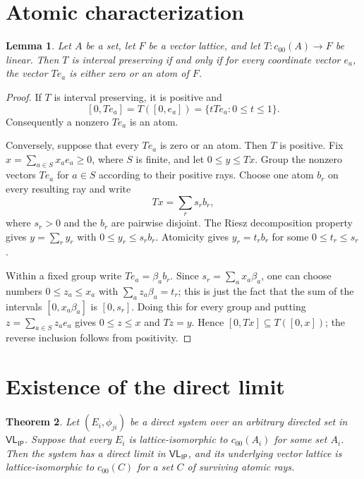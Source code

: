 \documentclass[11pt,a4paper]{article}
\newtheorem{theorem}{Theorem}
\newtheorem{lemma}[theorem]{Lemma}
\newcommand{\VLIP}{\mathsf{VL}_{\mathsf{IP}}}
\begin{document}
\section{Atomic characterization}

\begin{lemma}\label{lem:monomial}
Let $A$ be a set, let $F$ be a vector lattice, and let
$T:c_{00}(A)\to F$ be linear.  Then $T$ is interval preserving if and only if
for every coordinate vector $e_a$, the vector $Te_a$ is either zero or an
atom of $F$.
\end{lemma}

\begin{proof}
If $T$ is interval preserving, it is positive and
\[
 [0,Te_a]=T([0,e_a])=\{tTe_a:0\leq t\leq1\}.
\]
Consequently a nonzero $Te_a$ is an atom.

Conversely, suppose that every $Te_a$ is zero or an atom.  Then $T$ is
positive.  Fix $x=\sum_{a\in S}x_ae_a\geq0$, where $S$ is finite, and let
$0\leq y\leq Tx$.  Group the nonzero vectors $Te_a$ for $a\in S$ according
to their positive rays.  Choose one atom $b_r$ on every resulting ray and
write
\[
 Tx=\sum_r s_rb_r,
\]
where $s_r>0$ and the $b_r$ are pairwise disjoint.  The Riesz decomposition
property gives $y=\sum_r y_r$ with $0\leq y_r\leq s_rb_r$.  Atomicity gives
$y_r=t_rb_r$ for some $0\leq t_r\leq s_r$.

Within a fixed group write $Te_a=\beta_ab_r$.  Since
$s_r=\sum_a x_a\beta_a$, one can choose numbers
$0\leq z_a\leq x_a$ with $\sum_a z_a\beta_a=t_r$; this is just the fact that
the sum of the intervals $[0,x_a\beta_a]$ is $[0,s_r]$.  Doing this for every
group and putting $z=\sum_{a\in S}z_ae_a$ gives $0\leq z\leq x$ and
$Tz=y$.  Hence $[0,Tx]\subseteq T([0,x])$; the reverse inclusion follows
from positivity.
\end{proof}

\section{Existence of the direct limit}

\begin{theorem}\label{thm:limit}
Let $(E_i,\phi_{ji})$ be a direct system over an arbitrary directed set in
$\VLIP$.  Suppose that every $E_i$ is lattice-isomorphic to $c_{00}(A_i)$
for some set $A_i$.  Then the system has a direct limit in $\VLIP$, and its
underlying vector lattice is lattice-isomorphic to $c_{00}(C)$ for a set
$C$ of surviving atomic rays.
\end{theorem}
\end{document}
